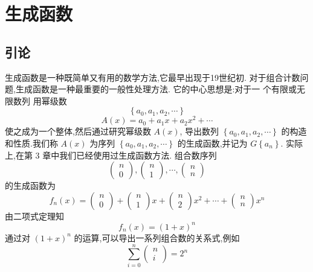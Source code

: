 \documentclass{report}
\begin{document}
\setcounter{chapter}{4}

\chapter{生成函数}

\section{引论}
生成函数是一种既简单又有用的数学方法,它最早出现于19世纪初.  对于组合计数问题,生成函数是一种最重要的一般性处理方法. 它的中心思想是:对于一 个有限或无限数列
用幂级数
$$
\left\{a_{0}, a_{1}, a_{2}, \cdots\right\}
$$
$$
A(x)=a_{0}+a_{1} x+a_{2} x^{2}+\cdots
$$
使之成为一个整体,然后通过研究幂级数 $A(x)$, 导出数列 $\left\{a_{0}, a_{1}, a_{2}, \cdots\right\}$ 的构造 和性质.我们称 $A(x)$ 为序列 $\left\{a_{0}, a_{1}, a_{2}, \cdots\right\}$ 的生成函数,并记为 $G\left\{a_{n}\right\}$.
实际上,在第 3 章中我们已经使用过生成函数方法. 组合数序列
$$
\left(\begin{array}{l}
n \\ 0
\end{array}\right),\left(\begin{array}{l}
n \\ 1
\end{array}\right), \cdots,\left(\begin{array}{l}
n \\ n
\end{array}\right)
$$
的生成函数为
$$
f_{n}(x)=\left(\begin{array}{l}
n \\ 0
\end{array}\right)+\left(\begin{array}{l}
n \\ 1
\end{array}\right) x+\left(\begin{array}{l}
n \\ 2
\end{array}\right) x^{2}+\cdots+\left(\begin{array}{l}
n \\ n
\end{array}\right) x^{n}
$$
由二项式定理知
$$
f_{n}(x)=(1+x)^{n}
$$
通过对 $(1+x)^{n}$ 的运算,可以导出一系列组合数的关系式,例如
$$
\sum_{i=0}^{n}\left(\begin{array}{l}
n \\ i
\end{array}\right)=2^{n}$$
\end{document}
